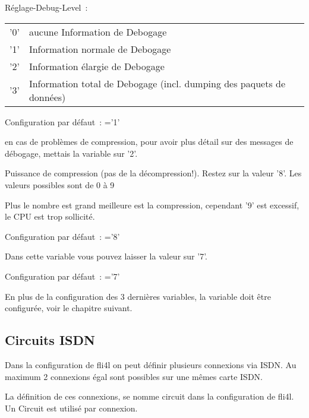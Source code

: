 \begin{description}

  Réglage-Debug-Level~:

  \begin{tabular}[h!]{ll}
    '0' & aucune Information de Debogage \\
    '1' & Information normale de Debogage \\
    '2' & Information élargie de Debogage \\
    '3' & Information total de Debogage  (incl. dumping des paquets de
    données)\\
  \end{tabular}

  Configuration par défaut~: ='1'

  en cas de problèmes de compression, pour avoir plus détail sur des messages
de débogage, mettais la variable sur '2'.


  Puissance de compression (pas de la décompression!). Restez sur la valeur '8'.
  Les valeurs possibles sont de 0 à 9

  Plus le nombre est grand meilleure est la compression, cependant '9'
  est excessif, le CPU est trop sollicité.

  Configuration par défaut~: ='8'


  Dans cette variable vous pouvez laisser la valeur sur '7'.

  Configuration par défaut~: ='7'

  En plus de la configuration des 3 dernières variables, la variable
   doit être configurée,
  voir le chapitre suivant.
\end{description}

\subsection{Circuits ISDN}

  Dans la configuration de fli4l on peut définir plusieurs connexions via ISDN.
  Au maximum 2 connexions égal sont possibles sur une mêmes carte ISDN.

  La définition de ces connexions, se nomme circuit dans la configuration de fli4l.
  Un Circuit est utilisé par connexion.

